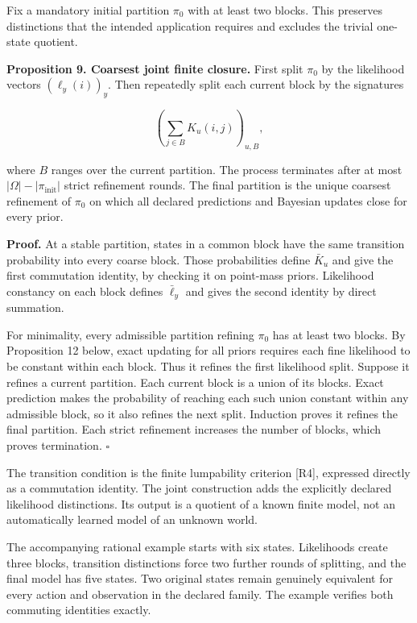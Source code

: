 Fix a mandatory initial partition \(\pi_0\) with at least two blocks.
This preserves distinctions that the intended application requires and
excludes the trivial one-state quotient.

\textbf{Proposition 9. Coarsest joint finite closure.} First split
\(\pi_0\) by the likelihood vectors \((\ell_y(i))_y\). Then repeatedly
split each current block by the signatures

\[
\left(\sum_{j\in B}K_u(i,j)\right)_{u,B},
\]

where \(B\) ranges over the current partition. The process terminates
after at most \(|\Omega|-|\pi_{\mathrm{init}}|\) strict refinement
rounds. The final partition is the unique coarsest refinement of
\(\pi_0\) on which all declared predictions and Bayesian updates close
for every prior.

\textbf{Proof.} At a stable partition, states in a common block have the
same transition probability into every coarse block. Those probabilities
define \(\bar K_u\) and give the first commutation identity, by checking
it on point-mass priors. Likelihood constancy on each block defines
\(\bar\ell_y\) and gives the second identity by direct summation.

For minimality, every admissible partition refining \(\pi_0\) has at
least two blocks. By Proposition 12 below, exact updating for all priors
requires each fine likelihood to be constant within each block. Thus it
refines the first likelihood split. Suppose it refines a current
partition. Each current block is a union of its blocks. Exact prediction
makes the probability of reaching each such union constant within any
admissible block, so it also refines the next split. Induction proves it
refines the final partition. Each strict refinement increases the number
of blocks, which proves termination. \(\square\)

The transition condition is the finite lumpability criterion {[}R4{]},
expressed directly as a commutation identity. The joint construction
adds the explicitly declared likelihood distinctions. Its output is a
quotient of a known finite model, not an automatically learned model of
an unknown world.

The accompanying rational example starts with six states. Likelihoods
create three blocks, transition distinctions force two further rounds of
splitting, and the final model has five states. Two original states
remain genuinely equivalent for every action and observation in the
declared family. The example verifies both commuting identities exactly.

